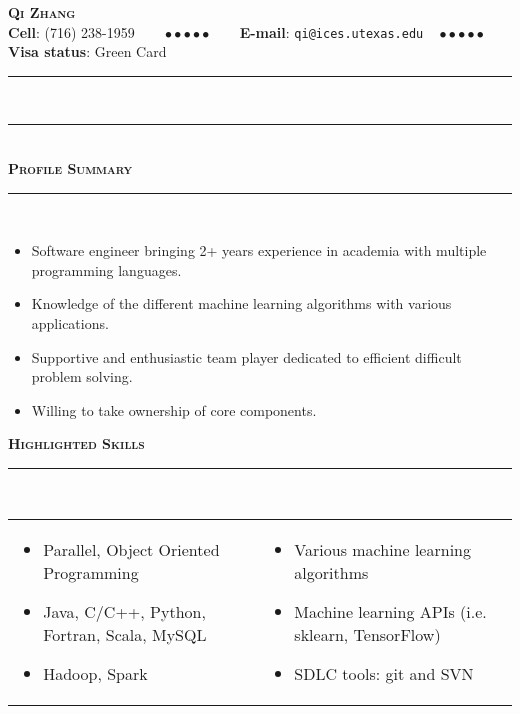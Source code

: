 \documentclass[11pt]{article}
\begin{document}
\begin{center}
{\huge\textbf{\textsc{{Qi Zhang}}}} \\[5pt]
\textbf{Cell}: (716) 238-1959 $\text{ }\quad\bullet\bullet\bullet\bullet\bullet\quad\text{ }$ \textbf{E-mail}: \texttt{qi@ices.utexas.edu} \quad$\text{ }\bullet\bullet\bullet\bullet\bullet\quad\text{  }$ \textbf{Visa status}: Green Card 
\end{center}
 \rule[0.8em]{\textwidth}{0.5pt} \\[-11pt]
 \rule[0.8em]{\textwidth}{0.5pt} \\[0pt]
\textbf{\textsc{\LARGE{Profile Summary}}} \\ \rule[0.8em]{\textwidth}{0.5pt} \\[-20pt]
\begin{itemize}[topsep=0pt,partopsep=0pt,leftmargin=16pt]
\item Software engineer bringing 2+ years experience in academia with multiple programming languages.
\item Knowledge of the different machine learning algorithms with various applications. 
\item Supportive and enthusiastic team player dedicated to efficient difficult problem solving.
\item Willing to take ownership of core components.
\end{itemize}
\vspace{12pt}
\textbf{\textsc{\LARGE{Highlighted Skills}}} \\ \rule[0.8em]{\textwidth}{0.5pt} \\[-12pt]
\begin{tabularx}{\textwidth}{>{\raggedright}X>{\raggedleft}p{}}
\begin{itemize}[topsep=0pt,partopsep=0pt,leftmargin=16pt]
\item Parallel, Object Oriented Programming 
\item Java, C/C++, Python, Fortran, Scala, MySQL
\item Hadoop, Spark 
\end{itemize}
&
\begin{itemize}[topsep=0pt,partopsep=0pt,leftmargin=16pt]
\item Various machine learning algorithms
\item Machine learning APIs (i.e. sklearn, TensorFlow)
\item SDLC tools: git and SVN
\end{itemize}
\tabularnewline[-12pt]
\end{tabularx}
\vspace{6pt}
\end{document}
